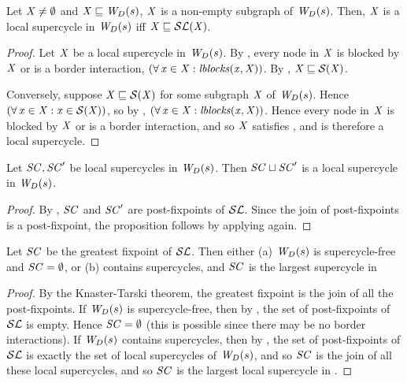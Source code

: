 \begin{proposition} \label{prop:locGFP} \label{prop:supercycleGFPLoc}
Let $\XS \ne \ewfg$ and $\XS \subg \lwfg{B}{s}{\DS}$, \ie $\XS$ is a non-empty subgraph of $\lwfg{\B}{s}{\DS}$.
Then, $\XS$ is a local supercycle in $\lwfg{\B}{s}{\DS}$ iff $\XS \subg \lSF{\XS}$.
\end{proposition}
%
\begin{proof}
Let $\XS$ be a local supercycle in $\lwfg{B}{s}{\DS}$. By , every node in $\XS$ is blocked by $\XS$ or is a border interaction, \ie 
$(\fa \ndx \in \XS: \lblocks{\ndx}{\XS})$. By , $\XS \subg \SF{\XS}$.

Conversely, suppose $\XS \subg \SF{\XS}$ for some subgraph $\XS$ of $\lwfg{B}{s}{\DS}$. Hence 
$(\fa \ndx \in \XS: \ndx \in \SF{\XS})$, so by , $(\fa \ndx \in \XS: \lblocks{\ndx}{\XS})$.
Hence every node in $\XS$ is blocked by $\XS$ or is a border interaction, and so $\XS$ satisfies , and is therefore a local supercycle.
\end{proof}

%
\begin{proposition} \label{prop:supercycleLoc:union}
Let $\SC, \SC'$ be local supercycles in $\lwfg{B}{s}{\DS}$. Then $\SC \join \SC'$ is
a local supercycle in $\lwfg{B}{s}{\DS}$.
\end{proposition}
%
\begin{proof}
By , $\SC$ and $\SC'$ are post-fixpoints of $\lSFs$. Since the join of post-fixpoints is a post-fixpoint, 
the proposition follows by applying  again.
\end{proof}


\begin{proposition} \label{prop:GFPisLargestSCLoc}
Let $\SC$ be the greatest fixpoint of $\lSFs$. Then either
(a) $\lwfg{B}{s}{\DS}$  is supercycle-free and $\SC = \ewfg$, or 
(b)  contains supercycles, and $\SC$ is the largest supercycle in 
\end{proposition}
%
\begin{proof}
By the Knaster-Tarski theorem, the greatest fixpoint is the join of all the post-fixpoints. 
If $\lwfg{B}{s}{\DS}$ is supercycle-free, then by , the set of post-fixpoints of $\lSFs$ is empty. 
Hence $\SC = \ewfg$ (this is possible since there may be no border interactions). %
If $\lwfg{B}{s}{\DS}$ contains supercycles, then by ,  the set of post-fixpoints of $\lSFs$ is exactly the set of 
local supercycles of $\lwfg{B}{s}{\DS}$, and so $\SC$ is the join of all these local supercycles, and so $\SC$ is the largest local supercycle in .
\end{proof}



